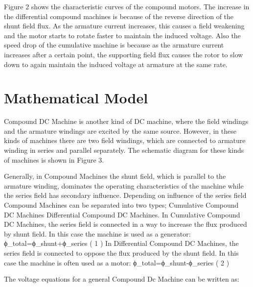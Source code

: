 
Figure 2 shows the characteristic curves of the compound motors. The increase in the differential compound machines is because of the reverse direction of the shunt field flux. As the armature current increases, this causes a field weakening and the motor starts to rotate faster to maintain the induced voltage. Also the speed drop of the cumulative machine is because as the armature current increases after a certain point, the supporting field flux causes the rotor to slow down to again maintain the induced voltage at armature at the same rate.

\section{Mathematical Model} %

Compound DC Machine is another kind of DC machine, where the field windings and the armature windings are excited by the same source. However, in these kinds of machines there are two field windings, which are connected to armature winding in series and parallel separately. The schematic diagram for these kinds of machines is shown in Figure 3.

Generally, in Compound Machines the shunt field, which is parallel to the armature winding, dominates the operating characteristics of the machine while the series field has secondary influence. Depending on influence of the series field Compound Machines can be separated into two types; 
	Cumulative Compound DC Machines 
	Differential Compound DC Machines.
In Cumulative Compound DC Machines, the series field is connected in a way to increase the flux produced by shunt field. In this case the machine is used as a generator:
ϕ_total=ϕ_shunt+ϕ_series	( 1 )
In Differential Compound DC Machines, the series field is connected to oppose the flux produced by the shunt field. In this case the machine is often used as a motor:
ϕ_total=ϕ_shunt-ϕ_series	( 2 )


The voltage equations for a general Compound Dc Machine can be written as:

